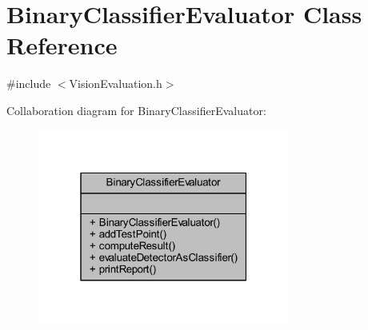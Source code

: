 \hypertarget{class_vision_core_1_1_evaluation_1_1_binary_classifier_evaluator}{}\section{Binary\+Classifier\+Evaluator Class Reference}
\label{class_vision_core_1_1_evaluation_1_1_binary_classifier_evaluator}


{\ttfamily \#include $<$Vision\+Evaluation.\+h$>$}



Collaboration diagram for Binary\+Classifier\+Evaluator\+:
\nopagebreak
\begin{figure}[H]
\begin{center}
\leavevmode
\includegraphics[width=235pt]{class_vision_core_1_1_evaluation_1_1_binary_classifier_evaluator__coll__graph}
\end{center}
\end{figure}
